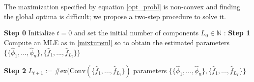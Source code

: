 \documentclass[12pt, reqno]{amsart}
\theoremstyle{definition}
\DeclareMathOperator*{\argmax}{arg\,max}
\begin{document}

The maximization specified by equation \eqref{opt_probl} is non-convex and finding the global optima is difficult; we propose a two-step procedure to solve it. 


\begin{algorithm}
\caption{Approximating the parameters of the richest cheap model}\label{alg:2step}
\begin{algorithmic}
\State \textbf{Step 0} Initialize $t=0$ and set the initial number of components $L_0 \in\mathbb{N}$
\Do:
\State \textbf{Step 1} Compute an MLE as in \eqref{mixtureml} so to obtain the estimated parameters $\{\{\hat{\phi}_1,...,\hat{\phi}_n\}, \{\hat{f}_1,...,\hat{f}_{L_{t}}\}\}$

\State \textbf{Step 2} $L_{t+1}:=\#\text{ex}(\text{Conv}(\{\hat{f}_1,...,\hat{f}_{L_{t}}\})$
 
\State \Return parameters $\{\{\hat{\phi}_1,...,\hat{\phi}_n\}, \{\hat{f}_1,...,\hat{f}_{L_T}\}\}$
\end{algorithmic}
\end{algorithm}

\end{document}
